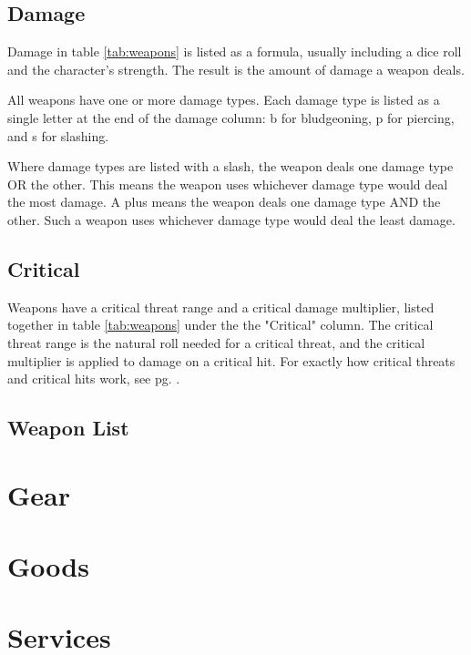\begin{multicols}{2}
    \subsection{Damage}
    Damage in table \ref{tab:weapons} is listed as a formula, usually
    including a dice roll and the character's strength. The result is the
    amount of damage a weapon deals.

    All weapons have one or more damage types. Each damage type is listed as
    a single letter at the end of the damage column: b for bludgeoning, p for
    piercing, and s for slashing.

    Where damage types are listed with a slash, the weapon deals one damage
    type OR the other. This means the weapon uses whichever damage type
    would deal the most damage. A plus means the weapon deals one damage
    type AND the other. Such a weapon uses whichever damage type would deal
    the least damage.

    \subsection{Critical}
    Weapons have a critical threat range and a
    critical damage multiplier, listed
    together in table \ref{tab:weapons} under the the "Critical" column. The
    critical threat range is the natural roll needed for a critical threat, and
    the critical multiplier is applied to damage on a critical hit. For exactly
    how critical threats and critical hits work, see pg.
    \pageref{combat:critical-hits}.

    \subsection{Weapon List}

    \section{Gear}

    \section{Goods}

    \section{Services}
\end{multicols}
